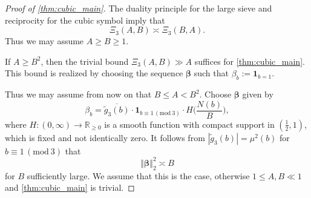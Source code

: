 \documentclass[12pt,reqno]{amsart}
\numberwithin{equation}{section}
\renewcommand{\pmod}[1]{\, (\mathrm{mod}\ #1)}
\newcommand\norm[1]{\left\Vert {#1} \right\Vert}
\begin{document}
\begin{proof}[Proof of \cref{thm:cubic_main}]
    The duality principle for the large sieve \cite[(7.9) to (7.11)]{IK} and reciprocity for the cubic symbol imply \cite[Lemma~3.1]{BGL} that
    \begin{equation} \label{eq:duality_cubic}
        \Xi_3(A, B) \asymp \Xi_3(B, A).
    \end{equation}
    Thus we may assume $A \geq B \geq 1$.
    
    If $A \geq B^2$, then the trivial bound $\Xi_3(A, B) \gg A$ suffices for \cref{thm:cubic_main}. 
    This bound is realized by choosing the sequence $\boldsymbol{\beta}$ such that $\beta_b:=\mathbf{1}_{b=1}$. 
    
    Thus we may assume from now on that $B \leq A < B^2$. Choose $\boldsymbol{\beta}$ given by
    \begin{equation*}
        \beta_b = \overline{\widetilde{g}_3(b)} \cdot \mathbf{1}_{b \equiv 1 \pmod{3}} \cdot H\Big(\frac{N(b)}{B} \Big),
    \end{equation*}
    where $H:(0,\infty) \to \mathbb{R}_{\geq 0}$ is a smooth function with compact support in $(\frac{1}{2},1)$, which is fixed and not identically zero. 
    It follows from $|{\widetilde{g}_3(b)}| = \mu^2(b)$ for $b \equiv 1 \pmod{3}$ that
    \begin{equation}\label{eq:beta_L2_norm_cubic}
        \norm{\boldsymbol{\beta}}^2_2 \asymp B
    \end{equation}
    for $B$ sufficiently large. We assume that this is the case, otherwise $1 \leq A, B \ll 1$ and \cref{thm:cubic_main} is trivial.


\end{proof}
\end{document}
